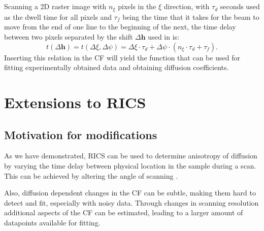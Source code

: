 \subsection{}
Scanning a 2D raster image with $n_\xi$ pixels in the $\xi$
direction, with $\tau_d$
seconds used as the dwell time for all pixels and $\tau_f$ being the
time that it takes for the beam to move from the end of one line to the
beginning of the next, the time delay between two pixels separated by
the shift $\Delta \mathbf{h}$ used in  is:
\begin{equation}
t(\Delta \mathbf{h}) = t(\Delta\xi,\Delta\psi) = \Delta\xi\cdot\tau_d +
\Delta\psi\cdot(n_\xi \cdot\tau_d +
\tau_f).
\label{eq:timedelay}
\end{equation}
Inserting this relation in the \ac{CF}  will yield the function that
can be used for fitting experimentally obtained data and obtaining
diffusion coefficients.

\section{Extensions to RICS}
\subsection{Motivation for modifications}

As we have demonstrated, \acs{RICS} can be used to determine anisotropy of
diffusion by varying the time delay between physical location in the
sample during a scan. This can be achieved by altering the angle 
of scanning \citep{Vendelin_08_AmJPhysiolCellPhysiol_295_pC1302}.

Also, diffusion dependent changes in the \ac{CF} can be subtle, making them hard to detect
and fit, especially with noisy data. Through changes in scanning
resolution additional aspects of the \ac{CF} can be estimated, leading to a
larger amount of datapoints available for fitting.  

